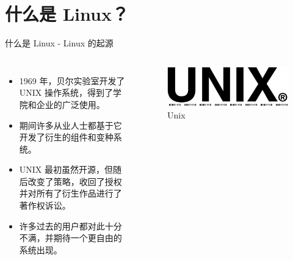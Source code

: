 \documentclass[UTF8]{ctexbeamer}
\begin{document}
\section{什么是 Linux？}
\begin{frame}{什么是 Linux - Linux 的起源}

    \begin{columns}
    \begin{itemize}
        \item 1969 年，贝尔实验室开发了 UNIX 操作系统，得到了学院和企业的广泛使用。
        \item 期间许多从业人士都基于它开发了衍生的组件和变种系统。
        \item UNIX 最初虽然开源，但随后改变了策略，收回了授权并对所有了衍生作品进行了著作权诉讼。
        \item 许多过去的用户都对此十分不满，并期待一个更自由的系统出现。
    \end{itemize}
    \begin{figure}
        \includegraphics[width=\textwidth]{unix.png}
        \caption{Unix}
        \label{fig:unix}
    \end{figure}
    
    \end{columns}

\end{frame}
\end{document}

